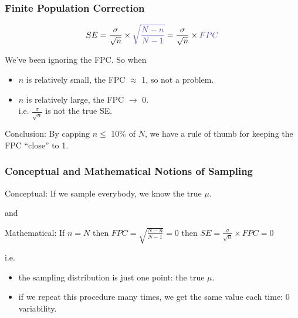 \documentclass[handout]{beamer}
\newcommand{\blue}[1]{\textcolor{blue2}{#1}}
\begin{document}
\begin{frame}[fragile]
\frametitle{Finite Population Correction}
%
%
\[
SE = \frac{\sigma}{\sqrt{n}} \times \blue{\sqrt{\frac{N-n}{N-1}}} =
\frac{\sigma}{\sqrt{n}} \times \blue{FPC}
\]

\vspace{0.25cm}
\pause
We've been ignoring the \blue{FPC}.  So when 
\begin{itemize}
\pause\item $n$ is relatively small, the FPC $\approx$ 1, so not a problem.
\pause\item $n$ is relatively large, the FPC $\longrightarrow$ 0.\\
i.e. $\frac{\sigma}{\sqrt{n}}$ is not the true SE.  
\end{itemize}

\vspace{0.25cm}
\pause Conclusion:  By capping $n \leq $ 10\% of $N$, we have a \blue{rule of thumb} for keeping the FPC ``close'' to 1.  

\end{frame}


\begin{frame}[fragile]
\frametitle{Conceptual and Mathematical Notions of Sampling}

\blue{Conceptual}:  If we sample everybody, we know the true $\mu$.
\begin{center}
\pause and
\end{center}
\blue{Mathematical}:  
If $n=N$ then $FPC = \sqrt{\frac{N-n}{N-1}} = 0$ then $SE = \frac{\sigma}{\sqrt{n}}\times FPC = 0$


\vspace{0.25cm}
\pause
i.e. 
\begin{itemize}
\item the sampling distribution is just one point: the true $\mu$.
\item if we repeat this procedure many times, we get the same value each time: 0 variability.
\end{itemize}


\end{frame}
\end{document}
